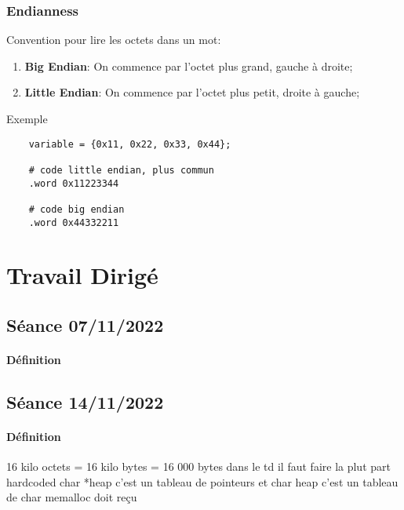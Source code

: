 \documentclass{article}
\begin{document}
\subsubsection{Endianness}
\begin{definition}
    Convention pour lire les octets dans un mot:
    \begin{enumerate}[noitemsep]
        \item \textbf{Big Endian}: On commence par l'octet plus grand, gauche à droite;
        \item \textbf{Little Endian}: On commence par l'octet plus petit, droite à gauche;
    \end{enumerate}
    Exemple    
    \begin{scriptsize}\myRISCV
        \begin{lstlisting}
    variable = {0x11, 0x22, 0x33, 0x44};
    
    # code little endian, plus commun
    .word 0x11223344
    
    # code big endian
    .word 0x44332211
        \end{lstlisting}
    \end{scriptsize}
\end{definition}


\section{Travail Dirigé}
\subsection{Séance 07/11/2022}
\paragraph{Définition}

\subsection{Séance 14/11/2022}
\paragraph{Définition}16 kilo octets = 16 kilo bytes = 16 000 bytes
dans le td il faut faire la plut part hardcoded
char *heap c'est un tableau de pointeurs et char heap c'est un tableau de char
memalloc doit reçu
\end{document}
